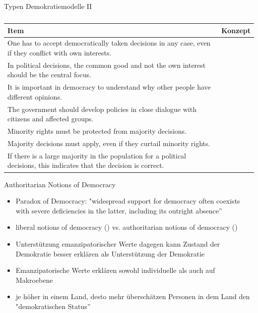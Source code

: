 \documentclass[11pt]{beamer}
\begin{document}
\begin{frame}{Typen Demokratiemodelle II} 
	\begin{table}[ht]
		\tiny
		\begin{tabular}{>{\raggedright}m{} >{\centering\arraybackslash}m{} }
			\toprule[2pt]
			Item & Konzept \\
			\midrule
			One has to accept democratically taken decisions in any case, even if they conflict with own interests. & \multirow{4}{*}{Deliberative proceduralism} \\
			In political decisions, the common good and not the own interest should be the central focus. &  \\
			It is important in democracy to understand why other people have different opinions. & \\
			The government should develop policies in close dialogue with citizens and affected groups. & \\
			\midrule
			Minority rights must be protected from majority decisions. & \multirow{3}{*}{Populist majoritarianism} \\
			Majority decisions must apply, even if they curtail minority rights. & \\
			If there is a large majority in the population for a political decisions, this indicates that the decision is correct. & \\
			\bottomrule[2pt]
		\end{tabular}
		\caption{\cite{Landwehr2017}}
	\end{table}
\end{frame}

\begin{frame}{Authoritarian Notions of Democracy}
	\begin{itemize}
		\item Paradox of Democracy: "widespread support for democracy often coexists with severe deficiencies in the latter, including its outright absence” \parencite[307]{Welzel2013}
		\item liberal notions of democracy () vs. authoritarian notions of democracy ()
		\item Unterstützung emanzipatorischer Werte dagegen kann Zustand der Demokratie besser erklären als Unterstützung der Demokratie
		\item Emanzipatorische Werte erklären sowohl individuelle  als auch  auf Makroebene
		\item je höher  in einem Land, desto mehr überschätzen Personen in dem Land den "demokratischen Status”
	\end{itemize}

\end{frame}
\end{document}

